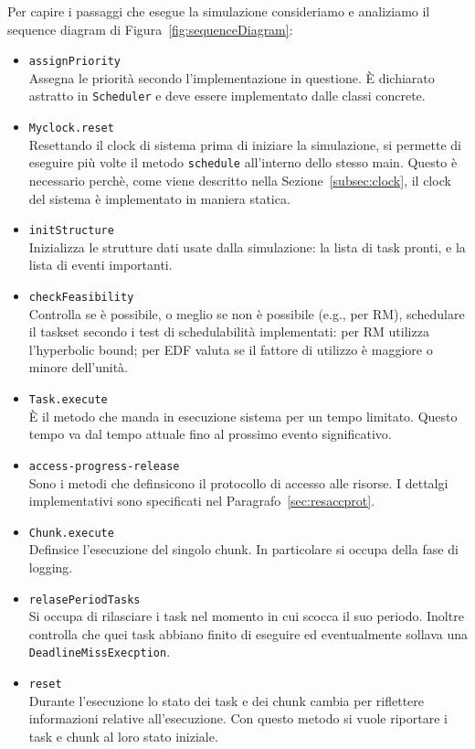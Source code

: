 Per capire i passaggi che esegue la simulazione consideriamo e analiziamo il sequence diagram di Figura~\ref{fig:sequenceDiagram}:
\begin{itemize}
    \item \texttt{assignPriority} \\
        Assegna le priorità secondo l'implementazione in questione. È dichiarato astratto in \texttt{Scheduler} e deve essere implementato dalle classi concrete.
    \item \texttt{Myclock.reset} \\
        Resettando il clock di sistema prima di iniziare la simulazione, si permette di eseguire più volte il metodo \texttt{schedule} all'interno dello stesso main. Questo è necessario perchè, come viene descritto nella Sezione~\ref{subsec:clock}, il clock del sistema è implementato in maniera statica.
    \item \texttt{initStructure} \\
        Inizializza le strutture dati usate dalla simulazione: la lista di task pronti, e la lista di eventi importanti.
    \item \texttt{checkFeasibility} \\
        Controlla se è possibile, o meglio se non è possibile (e.g., per RM), schedulare il taskset secondo i test di schedulabilità implementati: per RM utilizza l'hyperbolic bound; per EDF valuta se il fattore di utilizzo è maggiore o minore dell'unità.
    \item \texttt{Task.execute} \\
        È il metodo che manda in esecuzione sistema per un tempo limitato. Questo tempo va dal tempo attuale fino al prossimo evento significativo.
    \item \texttt{access-progress-release} \\
        Sono i metodi che definsicono il protocollo di accesso alle risorse. I dettalgi implementativi sono specificati nel Paragrafo~\ref{sec:resaccprot}.
    \item \texttt{Chunk.execute} \\
        Definsice l'esecuzione del singolo chunk. In particolare si occupa della fase di logging.
    \item \texttt{relasePeriodTasks} \\
        Si occupa di rilasciare i task nel momento in cui scocca il suo periodo. Inoltre controlla che quei task abbiano finito di eseguire ed eventualmente sollava una \texttt{DeadlineMissExecption}.
    \item \texttt{reset} \\
        Durante l'esecuzione lo stato dei task e dei chunk cambia per riflettere informazioni relative all'esecuzione. Con questo metodo si vuole riportare i task e chunk al loro stato iniziale.
\end{itemize}

